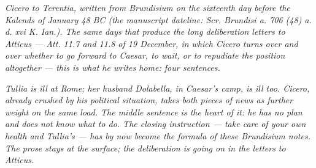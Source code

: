 
\textit{Cicero to Terentia, written from Brundisium on the
sixteenth day before the Kalends of January 48 BC (the
manuscript dateline: \textit{Scr. Brundisi a. 706 (48)
a. d. xvi K. Ian.}). The same days that produce the long
deliberation letters to Atticus --- \textit{Att.} 11.7 and
11.8 of 19 December, in which Cicero turns over and over
whether to go forward to Caesar, to wait, or to repudiate
the position altogether --- this is what he writes home:
four sentences.}

\textit{Tullia is ill at Rome; her husband Dolabella, in
Caesar's camp, is ill too. Cicero, already crushed by his
political situation, takes both pieces of news as further
weight on the same load. The middle sentence is the heart
of it: he has no plan and does not know what to do. The
closing instruction --- take care of your own health and
Tullia's --- has by now become the formula of these
Brundisium notes. The prose stays at the surface; the
deliberation is going on in the letters to Atticus.}
